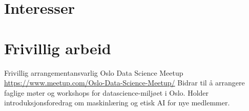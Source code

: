 \documentclass[a4paper, serif, 10pt]{moderncv}
\begin{document}
\section{Interesser}

\section{Frivillig arbeid}

        {Frivillig arrangementansvarlig}
        {Oslo Data Science Meetup}
        {\url{https://www.meetup.com/Oslo-Data-Science-Meetup/}}
        {}
        {Bidrar til å arrangere faglige møter og workshops for datascience-miljøet i Oslo.
Holder introduksjonsforedrag om maskinlæring og etisk AI for nye medlemmer.}
    
\end{document}
